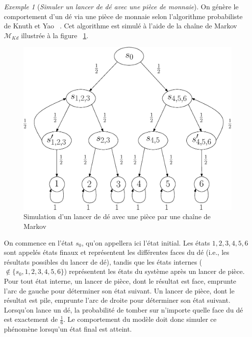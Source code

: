 \documentclass[12pt,a4paper]{report}
\theoremstyle{definition}%
\theoremstyle{remark}
\newtheorem{example}{Exemple}[chapter]
\newcommand{\ie}{i.e., }
\begin{document}
\begin{example} [\textit{Simuler un lancer de dé avec une pièce de monnaie}] \label{knuthdie}
	On génère le comportement d'un dé via une pièce de monnaie selon l'algorithme probabiliste de Knuth et Yao ~\cite{KY76}. Cet algorithme est simulé à l'aide de la chaîne de Markov $\mathcal{M}_{Kd}$ illustrée à la figure ~\ref{diebyacoin}.
	\begin{figure}[H]
		\centering
		\includegraphics[scale=0.5]{figures/dieByaCoin.eps}
		\caption{Simulation d'un lancer de dé avec une pièce par une chaîne de Markov}
		\label{diebyacoin}
	\end{figure}
	On commence en l'état $s_0$, qu'on appellera ici l'état initial. Les états $1, 2, 3, 4, 5, 6$ sont appelés états finaux et représentent les différentes faces du dé (\ie les résultats possibles du lancer de dé), tandis que les états internes ($\notin \{s_0, 1, 2, 3, 4, 5, 6\}$) représentent les états du système après un lancer de pièce.
	 Pour tout état interne, un lancer de pièce, dont le résultat est face, emprunte l'arc de gauche pour déterminer son état suivant. Un lancer de pièce, dont le résultat est pile, emprunte l'arc de droite pour déterminer son état suivant. Lorsqu'on lance un dé, la probabilité de tomber sur n'importe quelle face du dé est exactement de $\frac{1}{6}$. Le comportement du modèle doit donc simuler ce phénomène lorsqu'un état final est atteint.\\


\end{example}
\end{document}
